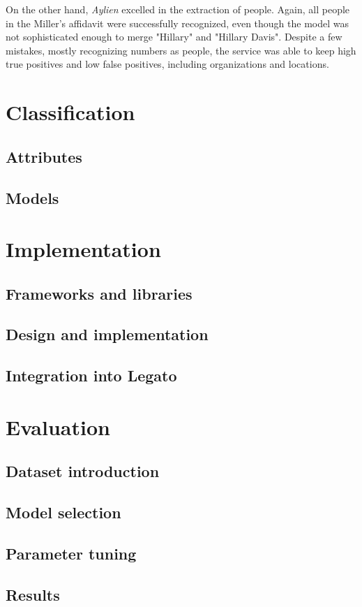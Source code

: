 \documentclass[
  digital, %
  table,   %
  lof,     %
  lot,     %
]{fithesis3}
\begin{document}
On the other hand, \textit{Aylien} excelled in the extraction of people.
Again, all people in the Miller's affidavit were successfully recognized, even though the model was not sophisticated enough to merge "Hillary" and "Hillary Davis".
Despite a few mistakes, mostly recognizing numbers as people, the service was able to keep high true positives and low false positives, including organizations and locations.


\chapter{Classification}
\section{Attributes}
\section{Models}

\chapter{Implementation}
\section{Frameworks and libraries}
\section{Design and implementation}
\section{Integration into Legato}

\chapter{Evaluation}
\section{Dataset introduction}
\section{Model selection}
\section{Parameter tuning}
\section{Results}
\end{document}
